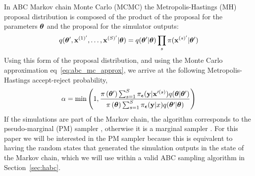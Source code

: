 \documentclass[]{article}
\begin{document}
In ABC Markov chain Monte Carlo (MCMC) \cite{marjoram2003markov,Wilkinson2013,sisson:2010} the Metropolis-Hastings (MH) proposal distribution is composed of the product of the proposal for the parameters ${\bm \theta}$ and the proposal for the simulator outputs:
\begin{equation}
  q( {\bm \theta^{\prime}}, {\bf x}^{(1)'}, \ldots, {\bf x}^{(S)'} | {\bm \theta} ) =  q( {\bm \theta^{\prime}} | {\bm \theta} ) \prod_s \pi( {\bf x}^{(s)'} | {\bm \theta^{\prime}})
\end{equation}
Using this form of the proposal distribution, and using the Monte Carlo approximation eq~\ref{eq:abc_mc_approx}, we arrive at the following Metropolis-Hastings accept-reject probability,
%
\begin{equation}
\alpha = \min \left( 1, \frac{\pi\left({\bm \theta^{\prime}}\right) \sum_{s=1}^S \pi_{{\bm {\epsilon}}}({\bf y} | {\bf x}^{\prime(s)} )  q( {\bm \theta} | {\bm \theta^{\prime}} )}{\pi\left({\bm \theta}\right) \sum_{s=1}^S \pi_{{\bm {\epsilon}}}({\bf y} | x ) q( {\bm \theta^{\prime}} | {\bm \theta} )} \right) \label{eq:abc_mh_acceptance_with_s}
\end{equation}
%
If the simulations are part of the Markov chain, the algorithm corresponds to the pseudo-marginal (PM) sampler \cite{andrieu2009pseudo}, otherwise it is a marginal sampler \cite{marjoram2003markov,sisson:2010}.   For this paper we will be interested in the PM sampler because this is equivalent to having the random states that generated the simulation outputs in the state of the Markov chain, which we will use within a valid ABC sampling algorithm in Section~\ref{sec:habc}.
%
\end{document}

